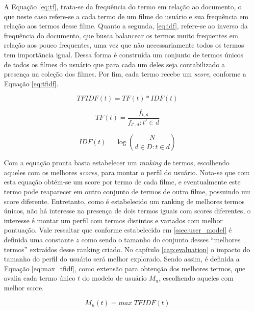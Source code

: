 A Equação \ref{eq:tf}, trata-se da frequência do termo em relação ao documento, o que neste caso refere-se a cada termo de um filme do usuário e sua frequência em relação aos termos desse filme. Quanto a segunda, \ref{eq:idf}, refere-se ao inverso da frequência do documento, que busca balancear os termos muito frequentes em relação aos pouco frequentes, uma vez que não necessariamente todos os termos tem importância igual. Dessa forma é construída um conjunto de termos únicos de todos os filmes do usuário que para cada um deles seja contabilizado a presença na coleção dos filmes. Por fim, cada termo recebe um \textit{score}, conforme a Equação {\ref{eq:tfidf}}.

\begin{equation}
	TFIDF(t) = TF(t) * IDF(t)
\label{eq:tfidf}
\end{equation}

\begin{equation}
	TF(t) = \frac{f_{t,d}}{f_{t',d} : t' \in d}
\label{eq:tf}
\end{equation}

\begin{equation}
	IDF(t) = \log (\frac{N}{d \in D : t \in d})
\label{eq:idf}
\end{equation}

Com a equação pronta basta estabelecer um \textit{ranking} de termos, escolhendo aqueles com os melhores \textit{scores}, para montar o perfil do usuário. Nota-se que com esta equação obtém-se um score por termo de cada filme, e eventualmente este termo pode reaparecer em outro conjunto de termos de outro filme, possuindo um score diferente. Entretanto, como é estabelecido um ranking de melhores termos únicos, não há interesse na presença de dois termos iguais com scores diferentes, o interesse é montar um perfil com termos distintos e variados com melhor pontuação. Vale ressaltar que conforme estabelecido em \ref{ssec:user_model} é definida uma constante $z$ como sendo o tamanho do conjunto desses \enquote{melhores termos} extraídos desse ranking criado. No capítulo \ref{cap:evaluation} o impacto do tamanho do perfil do usuário será melhor explorado.  Sendo assim, é definida a Equação \ref{eq:max_tfidf}, como extensão para obtenção dos melhores termos, que avalia cada termo único $t$ do modelo de usuário $M_u$, escolhendo aqueles com melhor score.

\begin{equation}
	M_u(t) = max \; TFIDF(t)
\label{eq:max_tfidf}
\end{equation}

